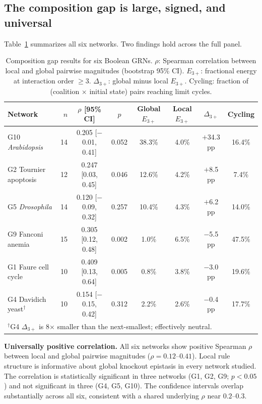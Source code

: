 \documentclass[11pt]{article}
\begin{document}
\subsection{The composition gap is large, signed, and universal}

Table~\ref{tab:results} summarizes all six networks. Two findings
hold across the full panel.

\begin{table}[t]
\centering
\caption{Composition gap results for six Boolean GRNs. $\rho$:
Spearman correlation between local and global pairwise magnitudes
(bootstrap 95\% CI). $E_{3+}$: fractional energy at interaction
order $\geq 3$. $\Delta_{3+}$: global minus local $E_{3+}$.
Cycling: fraction of (coalition $\times$ initial state) pairs
reaching limit cycles.}
\label{tab:results}
\begin{tabular}{lrcccccc}
\toprule
Network & $n$ & $\rho$ [95\% CI] & $p$ & Global $E_{3+}$ & Local $E_{3+}$ & $\Delta_{3+}$ & Cycling \\
\midrule
G10 \emph{Arabidopsis} & 14 & 0.205 [$-$0.01, 0.41] & 0.052 & 38.3\% & 4.0\% & $+$34.3 pp & 16.4\% \\
G2 Tournier apoptosis & 12 & 0.247 [0.03, 0.45] & 0.046 & 12.6\% & 4.2\% & $+$8.5 pp & 7.4\% \\
G5 \emph{Drosophila} & 14 & 0.120 [$-$0.09, 0.32] & 0.257 & 10.4\% & 4.3\% & $+$6.2 pp & 14.0\% \\
G9 Fanconi anemia & 15 & 0.305 [0.12, 0.48] & 0.002 & 1.0\% & 6.5\% & $-$5.5 pp & 47.5\% \\
G1 Faure cell cycle & 10 & 0.409 [0.13, 0.64] & 0.005 & 0.8\% & 3.8\% & $-$3.0 pp & 19.6\% \\
G4 Davidich yeast$^\dagger$ & 10 & 0.154 [$-$0.15, 0.42] & 0.312 & 2.2\% & 2.6\% & $-$0.4 pp & 17.7\% \\
\bottomrule
\multicolumn{8}{l}{\footnotesize $^\dagger$G4 $\Delta_{3+}$ is 8$\times$ smaller than the next-smallest; effectively neutral.}
\end{tabular}
\end{table}

\textbf{Universally positive correlation.}
All six networks show positive Spearman $\rho$ between local and
global pairwise magnitudes ($\rho = 0.12$--$0.41$). Local rule
structure is informative about global knockout epistasis in every
network studied. The correlation is statistically significant in three
networks (G1, G2, G9; $p < 0.05$) and not significant in three (G4,
G5, G10). The confidence intervals overlap substantially across all
six, consistent with a shared underlying $\rho$ near $0.2$--$0.3$.
\end{document}
